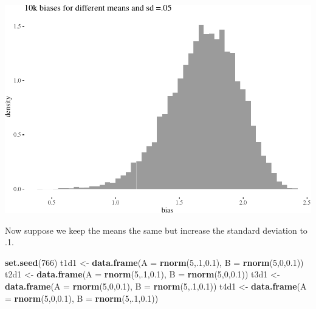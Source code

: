 \documentclass[10pt,dvipsnames,enabledeprecatedfontcommands]{scrartcl}
\newenvironment{Shaded}{\begin{snugshade}}{\end{snugshade}}
\newcommand{\KeywordTok}[1]{\textcolor[rgb]{0.13,0.29,0.53}{\textbf{#1}}}
\newcommand{\DataTypeTok}[1]{\textcolor[rgb]{0.13,0.29,0.53}{#1}}
\newcommand{\DecValTok}[1]{\textcolor[rgb]{0.00,0.00,0.81}{#1}}
\newcommand{\FloatTok}[1]{\textcolor[rgb]{0.00,0.00,0.81}{#1}}
\newcommand{\StringTok}[1]{\textcolor[rgb]{0.31,0.60,0.02}{#1}}
\newcommand{\NormalTok}[1]{#1}
\begin{document}
\begin{center}\includegraphics[width=1\linewidth]{paperDraft_files/figure-latex/unnamed-chunk-12-1} \end{center}

\normalsize

\noindent Now suppose we keep the means the same but increase the
standard deviation to .1.

\vspace{1mm} \footnotesize

\begin{Shaded}
\begin{Highlighting}[]
\KeywordTok{set.seed}\NormalTok{(}\DecValTok{766}\NormalTok{)}
\NormalTok{t1d1 <-}\StringTok{ }\KeywordTok{data.frame}\NormalTok{(}\DataTypeTok{A  =} \KeywordTok{rnorm}\NormalTok{(}\DecValTok{5}\NormalTok{,.}\DecValTok{1}\NormalTok{,}\FloatTok{0.1}\NormalTok{), }\DataTypeTok{B =} \KeywordTok{rnorm}\NormalTok{(}\DecValTok{5}\NormalTok{,}\DecValTok{0}\NormalTok{,}\FloatTok{0.1}\NormalTok{))}
\NormalTok{t2d1 <-}\StringTok{ }\KeywordTok{data.frame}\NormalTok{(}\DataTypeTok{A  =} \KeywordTok{rnorm}\NormalTok{(}\DecValTok{5}\NormalTok{,.}\DecValTok{1}\NormalTok{,}\FloatTok{0.1}\NormalTok{), }\DataTypeTok{B =} \KeywordTok{rnorm}\NormalTok{(}\DecValTok{5}\NormalTok{,}\DecValTok{0}\NormalTok{,}\FloatTok{0.1}\NormalTok{))}
\NormalTok{t3d1 <-}\StringTok{ }\KeywordTok{data.frame}\NormalTok{(}\DataTypeTok{A  =} \KeywordTok{rnorm}\NormalTok{(}\DecValTok{5}\NormalTok{,}\DecValTok{0}\NormalTok{,}\FloatTok{0.1}\NormalTok{), }\DataTypeTok{B =} \KeywordTok{rnorm}\NormalTok{(}\DecValTok{5}\NormalTok{,.}\DecValTok{1}\NormalTok{,}\FloatTok{0.1}\NormalTok{))}
\NormalTok{t4d1 <-}\StringTok{ }\KeywordTok{data.frame}\NormalTok{(}\DataTypeTok{A  =} \KeywordTok{rnorm}\NormalTok{(}\DecValTok{5}\NormalTok{,}\DecValTok{0}\NormalTok{,}\FloatTok{0.1}\NormalTok{), }\DataTypeTok{B =} \KeywordTok{rnorm}\NormalTok{(}\DecValTok{5}\NormalTok{,.}\DecValTok{1}\NormalTok{,}\FloatTok{0.1}\NormalTok{))}
\end{Highlighting}
\end{Shaded}
\end{document}
